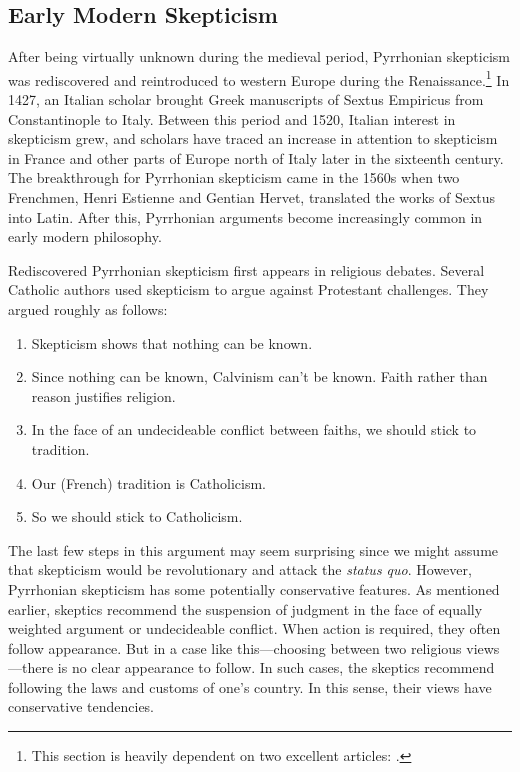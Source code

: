 \subsection*{Early Modern Skepticism}

After being virtually unknown during the medieval period, Pyrrhonian skepticism was rediscovered and reintroduced to western Europe during the Renaissance.\footnote{This section is heavily dependent on two excellent articles: \textcite{schmitt1983,popkin1993}.} In 1427, an Italian scholar brought Greek manuscripts of Sextus Empiricus from Constantinople to Italy. Between this period and 1520, Italian interest in skepticism grew, and scholars have traced an increase in attention to skepticism in France and other parts of Europe north of Italy later in the sixteenth century. The breakthrough for Pyrrhonian skepticism came in the 1560s when two Frenchmen, Henri Estienne  and Gentian Hervet, translated the works of Sextus into Latin. After this, Pyrrhonian arguments become increasingly common in early modern philosophy.

Rediscovered Pyrrhonian skepticism first appears in religious debates. Several Catholic authors used skepticism to argue against Protestant challenges. They argued roughly as follows:

\begin{enumerate}
    \item Skepticism shows that nothing can be known.
    \item Since nothing can be known, Calvinism can't be known. Faith rather than reason justifies religion.
    \item In the face of an undecideable conflict between faiths, we should stick to tradition.
    \item Our (French) tradition is Catholicism.
    \item So we should stick to Catholicism.
\end{enumerate}

The last few steps in this argument may seem surprising since we might assume that skepticism would be revolutionary and attack the \textit{status quo}. However, Pyrrhonian skepticism has some potentially conservative features. As mentioned earlier, skeptics recommend the suspension of judgment in the face of equally weighted argument or undecideable conflict. When action is required, they often follow appearance. But in a case like this---choosing between two religious views---there is no clear appearance to follow. In such cases, the skeptics recommend following the laws and customs of one's country. In this sense, their views have conservative tendencies.

